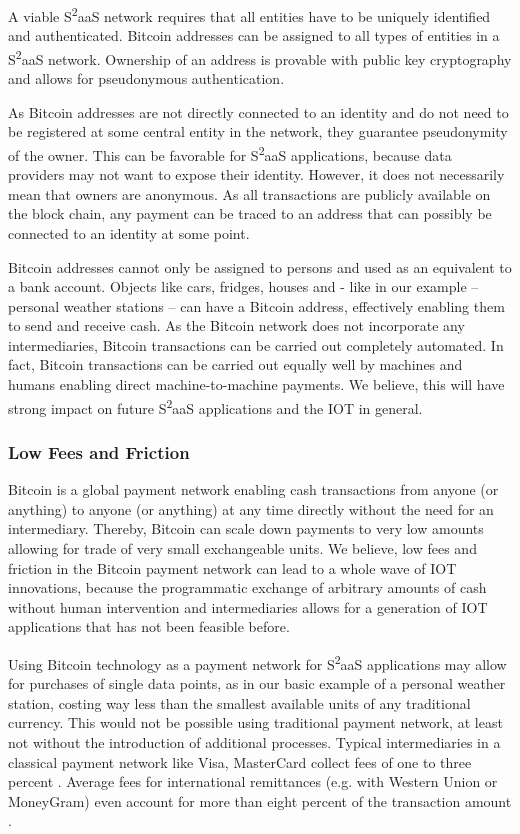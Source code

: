 A viable S\textsuperscript{2}aaS network requires that all entities have  to be  uniquely  identified  and  authenticated. Bitcoin addresses can be assigned to all types of entities in a S\textsuperscript{2}aaS network. Ownership of an address is provable with public key cryptography and allows for pseudonymous authentication.

As Bitcoin addresses are not directly connected to an identity and do not need to be registered at some central entity in the network, they guarantee pseudonymity of the owner. This can be favorable for S\textsuperscript{2}aaS applications, because data providers may not want to expose their identity. However, it does not necessarily mean that owners are anonymous. As all transactions are publicly available on the block chain, any payment can be traced to an address that can possibly be connected to an identity at some point.

Bitcoin addresses cannot only be assigned to persons and used as an equivalent to a bank account. Objects like cars, fridges, houses and - like in our example -- personal weather stations -- can have a Bitcoin address, effectively enabling them to send and receive cash. As the Bitcoin network does not incorporate any intermediaries, Bitcoin transactions can be carried out completely automated. In fact, Bitcoin transactions can be carried out equally well by machines and humans enabling direct machine-to-machine payments. We believe, this will have strong impact on future S\textsuperscript{2}aaS applications and the IOT in general.

\subsubsection{Low Fees and Friction}

Bitcoin is a global payment network enabling cash transactions from anyone (or anything) to anyone (or anything) at any time directly without the need for an intermediary. Thereby, Bitcoin can scale down payments to very low amounts allowing for trade of very small exchangeable units. We believe, low fees and friction in the Bitcoin payment network can lead to a whole wave of IOT innovations, because the programmatic exchange of arbitrary amounts of cash without human intervention and intermediaries allows for a generation of IOT applications that has not been feasible before.

Using Bitcoin technology as a payment network for S\textsuperscript{2}aaS applications may allow for purchases of single data points, as in our basic example of a personal weather station, costing way less than the smallest available units of any traditional currency. This would not be possible using traditional payment network, at least not without the introduction of additional processes. Typical intermediaries in a classical payment network like Visa, MasterCard collect fees of one to three percent \parencite{chakravorti2003theory}. Average fees for international remittances (e.g. with Western Union or MoneyGram) even account for more than eight percent of the transaction amount \parencite{remittances}.


